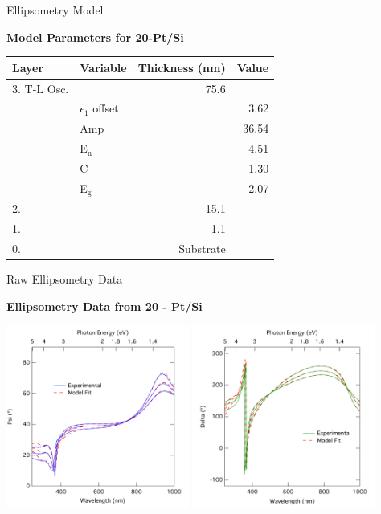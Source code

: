 \documentclass[professionalfont]{beamer}
\begin{document}
\begin{frame}{Ellipsometry Model}
	\begin{center}
	\normalsize
	\vspace*{-1em}
	{\bfseries\large Model Parameters for 20-Pt/Si}\\[1em]
	\begin{tabular}{l l r r}
	\toprule
	Layer&Variable&Thickness (nm)&Value\\
	\midrule
	3. T-L Osc.&&75.6&\\
	&$\epsilon_{1}$ offset&&3.62\\
	&Amp&&36.54\\
	&E$_{\mathrm{n}}$&&4.51\\
	&C&&1.30\\
	&E$_{\mathrm{g}}$&&2.07\\
	2. \ce{Pt}&&15.1&\\
	1. \ce{SiO2}&& 1.1\\
	0. \ce{Si}&&Substrate&\\
	\bottomrule
	\end{tabular}
	\end{center}
\end{frame}

\begin{frame}{Raw Ellipsometry Data}
		\begin{center}
		\textbf{\large Ellipsometry Data from 20 - Pt/Si}\vspace{0.25cm}
		\centerline{\includegraphics[width=0.45\textwidth]{./graphics/data/ellipsometry/run-20-pt/psi}%
				 \hspace{1cm}%
				 \includegraphics[width=0.45\textwidth]{./graphics/data/ellipsometry/run-20-pt/delta}}
		\end{center}
\end{frame}
\end{document}

